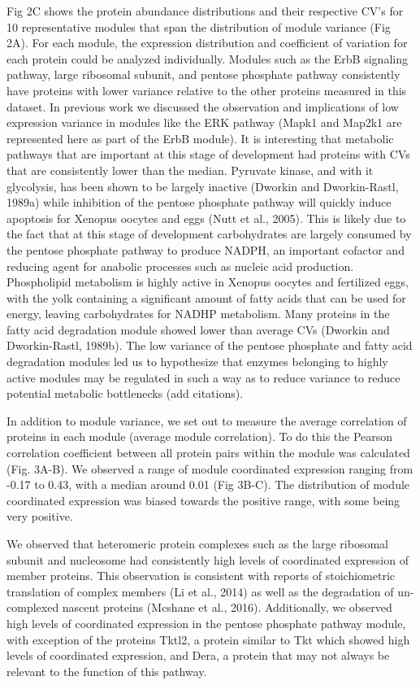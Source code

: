 Fig 2C shows the protein abundance distributions and their respective CV’s for 10 representative modules that span the distribution of module variance (Fig 2A). For each module, the expression distribution and coefficient of variation for each protein could be analyzed individually. Modules such as the ErbB signaling pathway, large ribosomal subunit, and pentose phosphate pathway consistently have proteins with lower variance relative to the other proteins measured in this dataset. In previous work we discussed the observation and implications of low expression variance in modules like the ERK pathway (Mapk1 and Map2k1 are represented here as part of the ErbB module). It is interesting that metabolic pathways that are important at this stage of development had proteins with CVs that are consistently lower than the median. Pyruvate kinase, and with it glycolysis, has been shown to be largely inactive (Dworkin and Dworkin-Rastl, 1989a) while inhibition of the pentose phosphate pathway will quickly induce apoptosis for Xenopus oocytes and eggs (Nutt et al., 2005). This is likely due to the fact that at this stage of development carbohydrates are largely consumed by the pentose phosphate pathway to produce NADPH, an important cofactor and reducing agent for anabolic processes such as nucleic acid production. Phospholipid metabolism is highly active in Xenopus oocytes and fertilized eggs, with the yolk containing a significant amount of fatty acids that can be used for energy, leaving carbohydrates for NADHP metabolism. Many proteins in the fatty acid degradation module showed lower than average CVs (Dworkin and Dworkin-Rastl, 1989b). The low variance of the pentose phosphate and fatty acid degradation modules led us to hypothesize that enzymes belonging to highly active modules may be regulated in such a way as to reduce variance to reduce potential metabolic bottlenecks (add citations).

In addition to module variance, we set out to measure the average correlation of proteins in each module (average module correlation). To do this the Pearson correlation coefficient between all protein pairs within the module was calculated (Fig. 3A-B). We observed a range of module coordinated expression ranging from -0.17 to 0.43, with a median around 0.01 (Fig 3B-C). The distribution of module coordinated expression was biased towards the positive range, with some being very positive. 

We observed that heteromeric protein complexes such as the large ribosomal subunit and nucleosome had consistently high levels of coordinated expression of member proteins. This observation is consistent with reports of stoichiometric translation of complex members (Li et al., 2014) as well as the degradation of un-complexed nascent proteins (Mcshane et al., 2016). Additionally, we observed high levels of coordinated expression in the pentose phosphate pathway module, with exception of the proteins Tktl2, a protein similar to Tkt which showed high levels of coordinated expression, and Dera, a protein that may not always be relevant to the function of this pathway. 

